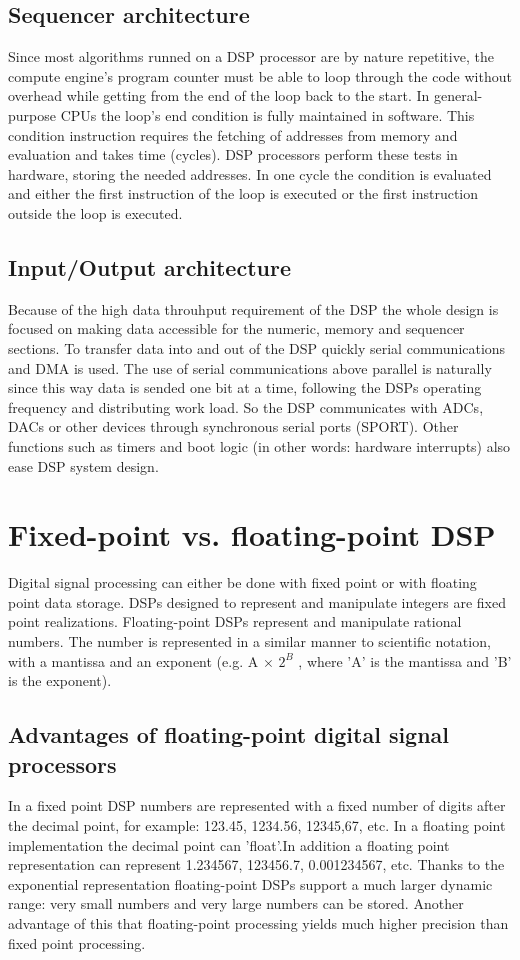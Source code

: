 \subsection{Sequencer architecture}
Since most algorithms runned on a DSP processor are by nature repetitive, the compute engine's program counter must be able to loop through the code without overhead while getting from the end of the loop back to the start. 
In general-purpose CPUs the loop's end condition is fully maintained in software. This condition instruction requires the fetching of addresses from memory and evaluation and takes time (cycles). DSP processors perform these tests in hardware, storing the needed addresses. In one cycle the condition is evaluated and either the first instruction of the loop is executed or the first instruction outside the loop is executed.

\subsection{Input/Output architecture}
Because of the high data throuhput requirement of the DSP the whole design is focused on making data accessible for the numeric, memory and sequencer sections. To transfer data into and out of the DSP quickly serial communications and DMA is used. The use of serial communications above parallel is naturally since this way data is sended one bit at a time, following the DSPs operating frequency and distributing work load. So the DSP communicates with ADCs, DACs or other devices through synchronous serial ports (SPORT). Other functions such as timers and boot logic (in other words: hardware interrupts) also ease DSP system design. 

\section{Fixed-point vs. floating-point DSP}
Digital signal processing can either be done with fixed point or with floating point data storage. DSPs designed to represent and manipulate integers are fixed point realizations. Floating-point DSPs represent and manipulate rational numbers. The number is represented in a similar manner to scientific notation, with a mantissa and an exponent (e.g. A $\times$ $2^{B}$ , where 'A' is the mantissa and 'B' is the exponent). 
\subsection{Advantages of floating-point digital signal processors}
In a fixed point DSP numbers are represented with a fixed number of digits after the decimal point, for example: 123.45, 1234.56, 12345,67, etc. In a floating point implementation the decimal point can 'float'.In addition a floating point representation can represent 1.234567, 123456.7, 0.001234567, etc.
Thanks to the exponential representation floating-point DSPs support a much larger dynamic range: very small numbers and very large numbers can be stored. Another advantage of this that floating-point processing yields much higher precision than fixed point processing.
